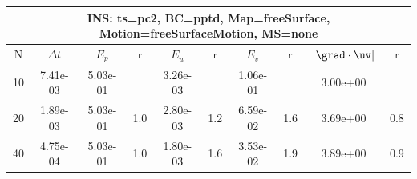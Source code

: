 
\begin{tabular}{|c|c|c|c|c|c|c|c|c|c|} \hline
 \multicolumn{10}{|c|}{INS: ts=pc2, BC=pptd, Map=freeSurface, Motion=freeSurfaceMotion, MS=none } \\ \hline 
     N  &   $\Delta t$ & $E_p$   &  r  &   $E_u$   &   r    &   $E_v$   & r   &  $|\grad\cdot\uv|$  & r   \\ \hline 
  10   &  7.41e-03  &   5.03e-01  &        &   3.26e-03  &        &   1.06e-01  &        &   3.00e+00  &        \\ 
  20   &  1.89e-03  &   5.03e-01  & 1.0  &   2.80e-03  & 1.2  &   6.59e-02  & 1.6  &   3.69e+00  & 0.8  \\ 
  40   &  4.75e-04  &   5.03e-01  & 1.0  &   1.80e-03  & 1.6  &   3.53e-02  & 1.9  &   3.89e+00  & 0.9  \\ 
 \hline 
\end{tabular}
